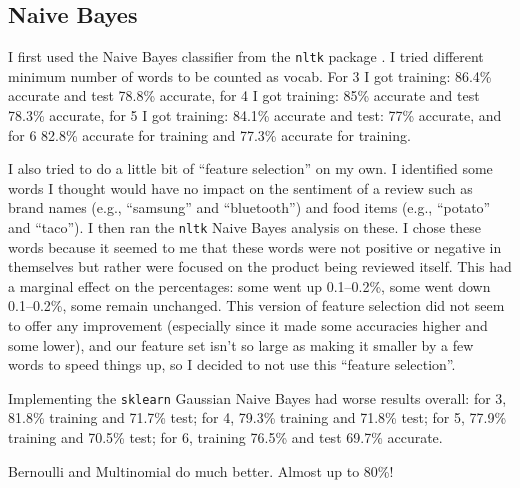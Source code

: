 \subsection{Naive Bayes}
I first used the Naive Bayes classifier from the \texttt{nltk} package \cite{bird2009}.  I tried different minimum number of words to be counted as vocab.  For 3 I got training: 86.4\% accurate and test 78.8\% accurate, for 4 I got training: 85\% accurate and test 78.3\% accurate, for 5 I got training: 84.1\% accurate and test: 77\% accurate, and for 6 82.8\% accurate for training and 77.3\% accurate for training.

I also tried to do a little bit of ``feature selection'' on my own.  I identified some words I thought would have no impact on the sentiment of a review such as brand names (e.g., ``samsung'' and ``bluetooth'') and food items (e.g., ``potato'' and ``taco'').  I then ran the \texttt{nltk} Naive Bayes analysis on these.  I chose these words because it seemed to me that these words were not positive or negative in themselves but rather were focused on the product being reviewed itself.  This had a marginal effect on the percentages: some went up 0.1--0.2\%, some went down 0.1--0.2\%, some remain unchanged.  This version of feature selection did not seem to offer any improvement (especially since it made some accuracies higher and some lower), and our feature set isn't so large as making it smaller by a few words to speed things up, so I decided to not use this ``feature selection''.

Implementing the \texttt{sklearn} \cite{zhu2009} Gaussian Naive Bayes had worse results overall: for 3, 81.8\% training and 71.7\% test; for 4, 79.3\% training and 71.8\% test; for 5, 77.9\% training and 70.5\% test; for 6, training 76.5\% and test 69.7\% accurate.

Bernoulli and Multinomial do much better.  Almost up to 80\%!